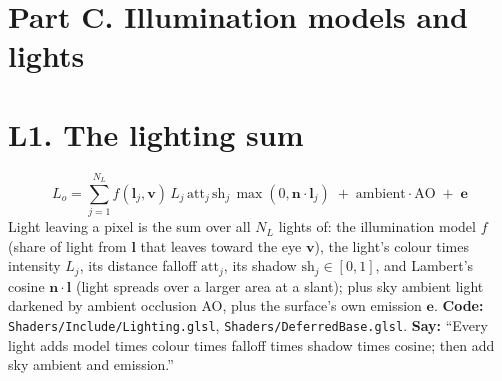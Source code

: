 \documentclass[11pt,a4paper]{article}
\newcommand{\code}[1]{{\small\texttt{#1}}}
\begin{document}
\section*{Part C. Illumination models and lights}

\section{L1. The lighting sum}
\[L_o=\sum\limits_{j=1}^{N_L}f(\mathbf l_j,\mathbf v)\,L_j\,\mathrm{att}_j\,\mathrm{sh}_j\,\max(0,\mathbf n\cdot\mathbf l_j)\;+\;\mathrm{ambient}\cdot\mathrm{AO}\;+\;\mathbf e\]
Light leaving a pixel is the sum over all $N_L$ lights of: the illumination model $f$ (share of light from $\mathbf l$ that leaves toward the eye $\mathbf v$), the light's colour times intensity $L_j$, its distance falloff $\mathrm{att}_j$, its shadow $\mathrm{sh}_j\in[0,1]$, and Lambert's cosine $\mathbf n\cdot\mathbf l$ (light spreads over a larger area at a slant); plus sky ambient light darkened by ambient occlusion AO, plus the surface's own emission $\mathbf e$. \textbf{Code:} \code{Shaders/Include/Lighting.glsl}, \code{Shaders/DeferredBase.glsl}. \textbf{Say:} ``Every light adds model times colour times falloff times shadow times cosine; then add sky ambient and emission.''
\end{document}
